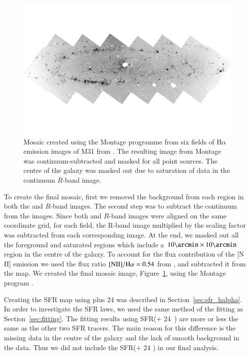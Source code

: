 \begin{figure}
\centering
\includegraphics[width=164mm]{../image_paper1/halpha.pdf}
\caption{Mosaic created using the Montage programme from six fields of H$\alpha$ emission images of M31 from \citet{Massey07}. The resulting image from Montage was continuum-subtracted and masked for all point sources. The centre of the galaxy was masked out due to saturation of data in the continuum $R$-band image.}
\label{fig:halpha}
\end{figure}

To create the final mosaic, first we removed the background from each region in both the \halpha and $R$-band images. The second step was to subtract the continuum from the \halpha images. Since both \halpha and $R$-band images were aligned on the same coordinate grid, for each field, the R-band image multiplied by the scaling factor was subtracted from each corresponding \halpha image. At the end, we masked out all the foreground and saturated regions which include a $10\arcmin \times 10\arcmin$ region in the centre of the galaxy. To account for the flux contribution of the [N II] emission we used the flux ratio ${\rm [NII]}/{\rm H}\alpha = 0.54$ from \citet{Kennicutt08}, and subtracted it from the \halpha map. We created the final mosaic image, Figure~\ref{fig:halpha}, using the Montage program \citep{Berriman08}.

Creating the SFR map using \halpha plus 24 \um was described in Section~\ref{sec:sfr_halpha}. In order to investigate the SFR laws, we used the same method of the fitting as Section~\ref{sec:fitting}. The fitting results using SFR(\halpha $+$ 24~\um) are more or less the same as the other two SFR tracers. The main reason for this difference is the missing data in the centre of the galaxy and the lack of smooth background in the \halpha data. Thus we did not include the SFR(\halpha $+$ 24 \um) in our final analysis.

